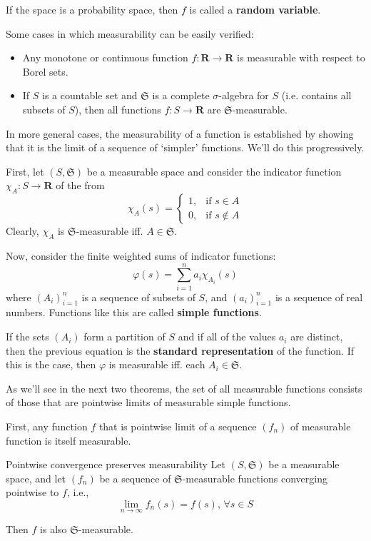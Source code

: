 If the space is a probability space, then $f$ is called a \textbf{random variable}.

Some cases in which measurability can be easily verified:
\begin{itemize}
	\item Any monotone or continuous function $f : \textbf{R} \longrightarrow \textbf{R}$ is measurable with respect to Borel sets.
	\item If $S$ is a countable set and $\mathfrak{S}$ is a complete $\sigma$-algebra for $S$ (i.e. contains all subsets of $S$), then all functions $f : S \longrightarrow \textbf{R}$ are $\mathfrak{S}$-measurable.
\end{itemize}

In more general cases, the measurability of a function is established by showing that it is the limit of a sequence of `simpler' functions. We'll do this progressively.

First, let $(S, \mathfrak{S})$ be a measurable space and consider the indicator function $\chi_A : S \longrightarrow \textbf{R}$ of the from
\[
\chi_A (s) = \begin{cases}
	1, & \text{if } s \in A\\
	0, & \text{if } s \notin A
	\end{cases}
\]
Clearly, $\chi_A$ is $\mathfrak{S}$-measurable iff. $A \in \mathfrak{S}$.

Now, consider the finite weighted sums of indicator functions:
\[
	\varphi(s) = \sum_{i=1}^n a_i \chi_{A_i}(s)
\]
where $(A_i)_{i=1}^n$ is a sequence of subsets of $S$, and $(a_i)_{i=1}^n$ is a sequence of real numbers. Functions like this are called \textbf{simple functions}.

If the sets $(A_i)$ form a partition of $S$ and if all of the values $a_i$ are distinct, then the previous equation is the \textbf{standard representation} of the function. If this is the case, then $\varphi$ is measurable iff. each $A_i \in \mathfrak{S}$.

As we'll see in the next two theorems, the set of all measurable functions consists of those that are pointwise limits of measurable simple functions.

First, any function $f$ that is pointwise limit of a sequence $(f_n)$ of measurable function is itself measurable.

\begin{theorem}[]{Pointwise convergence preserves measurability}{}
	Let $(S, \mathfrak{S})$ be a measurable space, and let $(f_n)$ be a sequence of $\mathfrak{S}$-measurable functions converging pointwise to $f$, i.e.,
	\[
		\lim_{n \to \infty} f_n(s) = f(s), \, \forall s \in S
	\]

	Then $f$ is also $\mathfrak{S}$-measurable.
\end{theorem}

